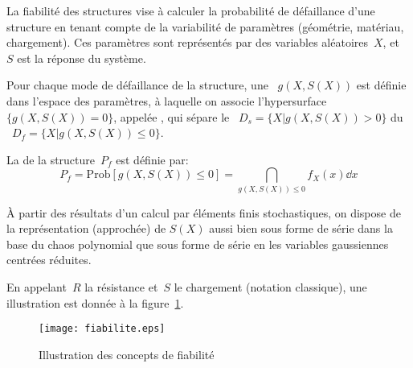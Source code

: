 La fiabilité des structures vise à calculer la probabilité de défaillance d'une structure en tenant compte de la variabilité de paramètres (géométrie, matériau,
chargement). Ces paramètres sont représentés par des variables aléatoires~$X$, et~$S$ est la réponse du système.

Pour chaque mode de défaillance de la structure, une ~$g(X,S(X))$ est définie dans l'espace des paramètres, à laquelle on associe l'hypersurface~$\{g(X,S(X)) = 0\}$, appelée , qui sépare le ~$D_s = \{X|g(X,S(X))>0\}$ du ~$D_f =\{X|g(X,S(X))\le0\}$.

La  de la structure~$P_f$ est définie par:
\begin{equation}
P_f = \text{Prob}[g(X,S(X))\le0] = \dint_{g(X,S(X))\le0} f_X(x)\dd x
\end{equation}

\medskip
À partir des résultats d'un calcul par éléments finis stochastiques, on dispose de la représentation (approchée) de $S(X)$ aussi bien sous forme de série dans la base du chaos polynomial que sous forme de série en les variables gaussiennes centrées réduites.

\medskip
En appelant~$R$ la résistance et~$S$ le chargement (notation classique), une illustration est donnée à la figure~\ref{Fig-StoFiab}.
\begin{figure}[htb]
\begin{center}
\texttt{[image: fiabilite.eps]}
\end{center}
\caption{Illustration des concepts de fiabilité}\label{Fig-StoFiab}
\end{figure}

